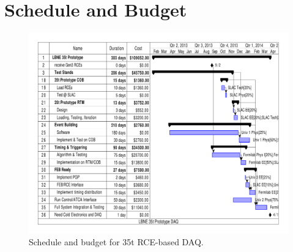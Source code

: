 \section{Schedule and Budget}

\begin{figure}[htb]
\includegraphics[scale=0.8,angle=90]{project-gantt.pdf}
\caption{Schedule and budget for 35t RCE-based DAQ.}
\label{fig:budget35t}
\end{figure} 